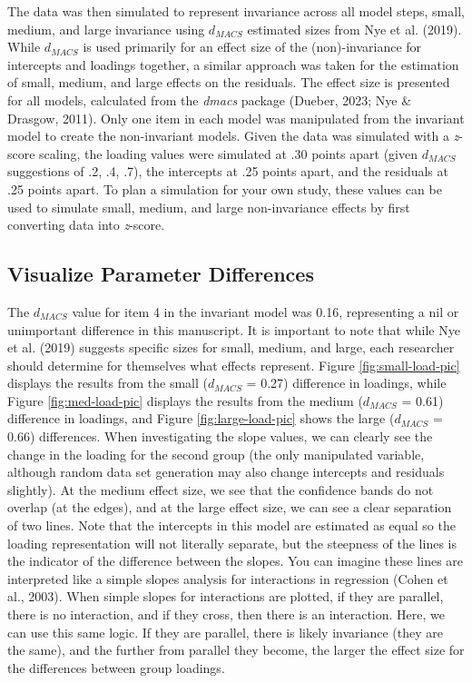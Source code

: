\documentclass[
  man,floatsintext]{apa7}
\begin{document}
The data was then simulated to represent invariance across all model steps, small, medium, and large invariance using \(d_{MACS}\) estimated sizes from Nye et al. (2019). While \(d_{MACS}\) is used primarily for an effect size of the (non)-invariance for intercepts and loadings together, a similar approach was taken for the estimation of small, medium, and large effects on the residuals. The effect size is presented for all models, calculated from the \emph{dmacs} package (Dueber, 2023; Nye \& Drasgow, 2011). Only one item in each model was manipulated from the invariant model to create the non-invariant models. Given the data was simulated with a \emph{z}-score scaling, the loading values were simulated at .30 points apart (given \(d_{MACS}\) suggestions of .2, .4, .7), the intercepts at .25 points apart, and the residuals at .25 points apart. To plan a simulation for your own study, these values can be used to simulate small, medium, and large non-invariance effects by first converting data into \emph{z}-score.

\subsection{Visualize Parameter Differences}\label{visualize-parameter-differences}

The \(d_{MACS}\) value for item 4 in the invariant model was 0.16, representing a nil or unimportant difference in this manuscript. It is important to note that while Nye et al. (2019) suggests specific sizes for small, medium, and large, each researcher should determine for themselves what effects represent. Figure \ref{fig:small-load-pic} displays the results from the small (\(d_{MACS}\) = 0.27) difference in loadings, while Figure \ref{fig:med-load-pic} displays the results from the medium (\(d_{MACS}\) = 0.61) difference in loadings, and Figure \ref{fig:large-load-pic} shows the large (\(d_{MACS}\) = 0.66) differences. When investigating the slope values, we can clearly see the change in the loading for the second group (the only manipulated variable, although random data set generation may also change intercepts and residuals slightly). At the medium effect size, we see that the confidence bands do not overlap (at the edges), and at the large effect size, we can see a clear separation of two lines. Note that the intercepts in this model are estimated as equal so the loading representation will not literally separate, but the steepness of the lines is the indicator of the difference between the slopes. You can imagine these lines are interpreted like a simple slopes analysis for interactions in regression (Cohen et al., 2003). When simple slopes for interactions are plotted, if they are parallel, there is no interaction, and if they cross, then there is an interaction. Here, we can use this same logic. If they are parallel, there is likely invariance (they are the same), and the further from parallel they become, the larger the effect size for the differences between group loadings.
\end{document}
